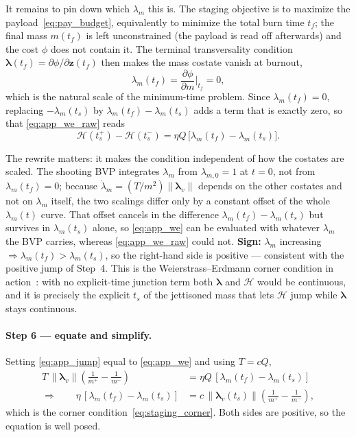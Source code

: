 \documentclass[../main.tex]{subfiles}
\begin{document}
It remains to pin down which $\lambda_m$ this is. The staging objective is to maximize the payload~\eqref{eq:pay_budget}, equivalently to minimize the total burn time $t_f$; the final mass $m(t_f)$ is left unconstrained (the payload is read off afterwards) and the cost $\phi$ does not contain it. The terminal transversality condition $\boldsymbol{\lambda}(t_f) = \partial\phi/\partial\mathbf{z}(t_f)$ then makes the mass costate vanish at burnout,
\begin{equation}
  \lambda_m(t_f) = \frac{\partial\phi}{\partial m}\bigg|_{t_f} = 0 ,
  \label{eq:app_lmtf}
\end{equation}
which is the natural scale of the minimum-time problem. Since $\lambda_m(t_f) = 0$, replacing $-\lambda_m(t_s)$ by $\lambda_m(t_f) - \lambda_m(t_s)$ adds a term that is exactly zero, so that \eqref{eq:app_we_raw} reads
\begin{equation}
  \mathcal{H}(t_s^+) - \mathcal{H}(t_s^-) = \eta Q\,\bigl[\lambda_m(t_f) - \lambda_m(t_s)\bigr].
  \label{eq:app_we}
\end{equation}

The rewrite matters: it makes the condition independent of how the costates are scaled. The shooting BVP integrates $\lambda_m$ from $\lambda_{m,0} = 1$ at $t = 0$, not from $\lambda_m(t_f) = 0$; because $\dot\lambda_m = (T/m^2)\|\boldsymbol{\lambda}_v\|$ depends on the other costates and not on $\lambda_m$ itself, the two scalings differ only by a constant offset of the whole $\lambda_m(t)$ curve. That offset cancels in the difference $\lambda_m(t_f) - \lambda_m(t_s)$ but survives in $\lambda_m(t_s)$ alone, so \eqref{eq:app_we} can be evaluated with whatever $\lambda_m$ the BVP carries, whereas \eqref{eq:app_we_raw} could not. \textbf{Sign:} $\lambda_m$ increasing $\Rightarrow \lambda_m(t_f) > \lambda_m(t_s)$, so the right-hand side is positive --- consistent with the positive jump of Step~4. This is the Weierstrass--Erdmann corner condition in action~\cite[Sec.~3.13, Prob.~1]{bryson1975}: with no explicit-time junction term both $\boldsymbol{\lambda}$ and $\mathcal{H}$ would be continuous, and it is precisely the explicit $t_s$ of the jettisoned mass that lets $\mathcal{H}$ jump while $\boldsymbol{\lambda}$ stays continuous.

\paragraph{Step 6 --- equate and simplify.}
Setting \eqref{eq:app_jump} equal to \eqref{eq:app_we} and using $T = cQ$,
\begin{equation}
\begin{aligned}
  T\,\|\boldsymbol{\lambda}_v\|\left(\frac{1}{m^+} - \frac{1}{m^-}\right)
  &= \eta Q\,[\lambda_m(t_f) - \lambda_m(t_s)] \\
  \Longrightarrow\qquad
  \eta\,[\lambda_m(t_f) - \lambda_m(t_s)]
  &= c\,\|\boldsymbol{\lambda}_v(t_s)\|\left(\frac{1}{m^+} - \frac{1}{m^-}\right),
\end{aligned}
\end{equation}
which is the corner condition~\eqref{eq:staging_corner}. Both sides are positive, so the equation is well posed.
\end{document}
